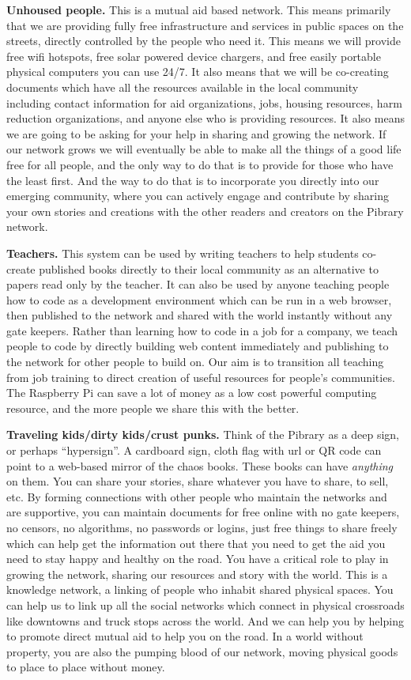 \textbf{Unhoused people.} This is a mutual aid based network. This means
primarily that we are providing fully free infrastructure and services
in public spaces on the streets, directly controlled by the people who
need it. This means we will provide free wifi hotspots, free solar
powered device chargers, and free easily portable physical computers you
can use 24/7. It also means that we will be co-creating documents which
have all the resources available in the local community including
contact information for aid organizations, jobs, housing resources, harm
reduction organizations, and anyone else who is providing resources. It
also means we are going to be asking for your help in sharing and
growing the network. If our network grows we will eventually be able to
make all the things of a good life free for all people, and the only way
to do that is to provide for those who have the least first. And the way
to do that is to incorporate you directly into our emerging community,
where you can actively engage and contribute by sharing your own stories
and creations with the other readers and creators on the Pibrary
network.

\textbf{Teachers.} This system can be used by writing teachers to help
students co-create published books directly to their local community as
an alternative to papers read only by the teacher. It can also be used
by anyone teaching people how to code as a development environment which
can be run in a web browser, then published to the network and shared
with the world instantly without any gate keepers. Rather than learning
how to code in a job for a company, we teach people to code by directly
building web content immediately and publishing to the network for other
people to build on. Our aim is to transition all teaching from job
training to direct creation of useful resources for people's
communities. The Raspberry Pi can save a lot of money as a low cost
powerful computing resource, and the more people we share this with the
better.

\textbf{Traveling kids/dirty kids/crust punks.} Think of the Pibrary as
a deep sign, or perhaps ``hypersign''. A cardboard sign, cloth flag with
url or QR code can point to a web-based mirror of the chaos books. These
books can have \emph{anything} on them. You can share your stories,
share whatever you have to share, to sell, etc. By forming connections
with other people who maintain the networks and are supportive, you can
maintain documents for free online with no gate keepers, no censors, no
algorithms, no passwords or logins, just free things to share freely
which can help get the information out there that you need to get the
aid you need to stay happy and healthy on the road. You have a critical
role to play in growing the network, sharing our resources and story
with the world. This is a knowledge network, a linking of people who
inhabit shared physical spaces. You can help us to link up all the
social networks which connect in physical crossroads like downtowns and
truck stops across the world. And we can help you by helping to promote
direct mutual aid to help you on the road. In a world without property,
you are also the pumping blood of our network, moving physical goods to
place to place without money.

